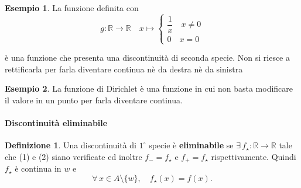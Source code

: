 \documentclass{article}
\theoremstyle{plain}
\theoremstyle{definition}
\newtheorem{defn}{Definizione}[section]
\newtheorem{exmp}{Esempio}[section]
\theoremstyle{remark}
\begin{document}
\begin{exmp}
    La funzione definita con
    \[g:\mathbb{R}\to\mathbb{R}\quad 
        x\mapsto
        \begin{cases}
            \dfrac{1}{x}\quad x\neq0\\
            0\quad x=0
        \end{cases}\]
    \begin{center}
        \centering 
    \end{center}
    è una funzione che presenta una discontinuità di seconda specie. Non si riesce a rettificarla per farla diventare continua nè da destra nè da sinistra
\end{exmp}

\vspace{10pt}

\begin{exmp}
    La funzione di Dirichlet è una funzione in cui non basta modificare il valore in un punto per farla diventare continua.
\end{exmp}


\vspace{10pt}

\paragraph{Discontinuità eliminabile}
\begin{bxthm}
\begin{defn}
    Una discontinuità di $1^\circ$ specie è \textbf{eliminabile} se $\exists\, f_\star:\mathbb{R}\to\mathbb{R}$ tale che (1) e (2) siano verificate ed inoltre
    $f_-=f_\star$ e $f_+=f_\star$ rispettivamente. 
    Quindi $f_\star$ è continua in $w$ e \[\forall\, x\in A\setminus\{w\},\quad f_\star(x)=f(x).\]    
\end{defn}
\end{bxthm}
\end{document}
